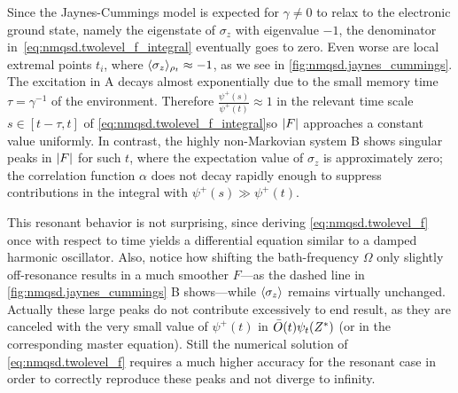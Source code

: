 Since the Jaynes-Cummings model is expected for $\gamma \neq 0$ to relax to the electronic ground state, namely the eigenstate of $\sigma_z$ with eigenvalue $-1$, the denominator in~\ref{eq:nmqsd.twolevel_f_integral} eventually goes to zero.
Even worse are local extremal points $t_i$, where $\langle \sigma_z \rangle_{\rho_t} \approx -1$, as we see in \autoref{fig:nmqsd.jaynes_cummings}.
The excitation in A decays almost exponentially due to the small memory time $\tau = \gamma^{-1}$ of the environment.
Therefore $\frac{\psi^+(s)}{\psi^+(t)} \approx 1$ in the relevant time scale $s \in [t - \tau, t]$ of \autoref{eq:nmqsd.twolevel_f_integral}so $\left\vert F \right\vert$ approaches a constant value uniformly.
In contrast, the highly non-Markovian system B shows singular peaks in $\left\vert F \right\vert$ for such $t$, where the expectation value of $\sigma_z$ is approximately zero;
the correlation function $\alpha$ does not decay rapidly enough to suppress contributions in the integral with $\psi^+(s) \gg \psi^+(t)$.


This resonant behavior is not surprising, since deriving \autoref{eq:nmqsd.twolevel_f} once with respect to time yields a differential equation similar to a damped harmonic oscillator.
Also, notice how shifting the bath-frequency $\Omega$ only slightly off-resonance results in a much smoother $F$---as the dashed line in \autoref{fig:nmqsd.jaynes_cummings} B shows---while $\langle \sigma_z \rangle$ remains virtually unchanged.
Actually these large peaks do not contribute excessively to end result, as they are canceled with the very small value of $\psi^+(t)$ in $\bar O(t) \psitZ$ (or in the corresponding master equation).
Still the numerical solution of \autoref{eq:nmqsd.twolevel_f} requires a much higher accuracy for the resonant case in order to correctly reproduce these peaks and not diverge to infinity.\\


